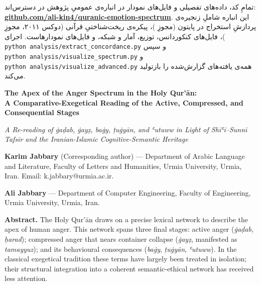 \documentclass[12pt,a4paper]{article}
\newenvironment{englishabstract}
  {%
    \clearpage
    \begin{LTR}%
    \DefaultMathsDigits
    \englishbody
    \setstretch{1.25}%
    \setlength{\parindent}{0pt}%
    \setlength{\parskip}{0.6em plus 0.2em}%
  }%
  {\end{LTR}}
\begin{document}
\begin{RTL}
\begin{otherlanguage}{persian}
تمامِ کد، داده‌های تفصیلی و فایل‌های نمودار در انباره‌ی عمومیِ پژوهش در
دسترس‌اند:
\textbf{\href{https://github.com/ali-kin4/quranic-emotion-spectrum}{github.com/ali-kin4/quranic-emotion-spectrum}}.
این انباره شاملِ زنجیره‌ی پردازشِ استخراج در پایتون (مجوزِ )، پیکره‌ی
ریخت‌شناختیِ قرآنی (دوکس ۲۰۱۱، مجوزِ )، فایل‌های  کنکوردانس،
توزیع، آمار و شبکه، و فایل‌های  نمودارهاست. اجرای
\texttt{python\ analysis/extract\_concordance.py} و سپس
\texttt{python\ analysis/visualize\_spectrum.py} و
\texttt{python\ analysis/visualize\_advanced.py} همه‌ی یافته‌های گزارش‌شده
را بازتولید می‌کند.

\end{otherlanguage}
\end{RTL}

\begin{englishabstract}

\begin{center}
{\Large\bfseries The Apex of the Anger Spectrum in the Holy Qur’ān:\\
A Comparative-Exegetical Reading of the Active, Compressed, and Consequential Stages\par}
\vspace{6pt}
{\itshape A Re-reading of ġaḍab, ġayẓ, baġy, ṭuġyān, and ʿutuww in Light of Shīʿī–Sunnī Tafsīr and the Iranian-Islamic Cognitive-Semantic Heritage\par}
\end{center}

\vspace{6pt}

\textbf{Karim Jabbary} (Corresponding author) — Department of Arabic Language and Literature, Faculty of Letters and Humanities, Urmia University, Urmia, Iran. Email: k.jabbary@urmia.ac.ir.

\textbf{Ali Jabbary} — Department of Computer Engineering, Faculty of Engineering, Urmia University, Urmia, Iran.

\vspace{8pt}

\noindent\textbf{Abstract.} The Holy Qur’ān draws on a precise lexical network to describe the apex of human anger. This network spans three final stages: active anger (\textit{ġaḍab}, \textit{ḥarad}); compressed anger that nears container collapse (\textit{ġayẓ}, manifested as \textit{tamayyuz}); and its behavioural consequences (\textit{baġy}, \textit{ṭuġyān}, \textit{ʿutuww}). In the classical exegetical tradition these terms have largely been treated in isolation; their structural integration into a coherent semantic-ethical network has received less attention.


\end{englishabstract}
\end{document}
